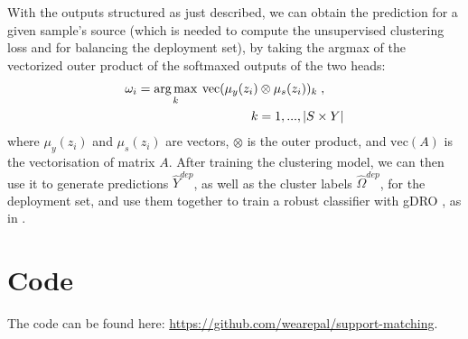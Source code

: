 With the outputs structured as just described, we can obtain the prediction for a given sample's
source (which is needed to compute the unsupervised clustering loss and for balancing the
deployment set), by taking the argmax of the vectorized outer product of the softmaxed outputs of
the two heads:
%
\begin{align}
&\omega_i = \operatorname*{arg\,max}\limits_{k} \: \mathrm{vec}(\mu_y(z_i) \otimes \mu_s(z_i))_k\;,\\
&\quad\quad\quad\quad\quad\quad\quad\quad\quad\quad k = 1, ..., |S \times Y| \nonumber
\end{align}
%
where $\mu_y(z_i)$ and $\mu_s(z_i)$ are vectors, $\otimes$ is the outer product, and
$\mathrm{vec}(A)$ is the vectorisation of matrix $A$. 
%
After training the clustering model, we can then use it to generate predictions $\hat{Y}^{dep}$, as
well as the cluster labels $\hat{\Omega}^{dep}$, for the deployment set, and use them together to
train a robust classifier with gDRO \cite{sagawa2019distributionally}, as in
\cite{SohDunAngGuetal20}.
%
\section{Code}
%
The code can be found here: \url{https://github.com/wearepal/support-matching}.
%

